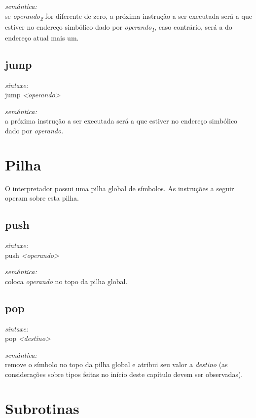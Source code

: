 \documentclass[12pt,a4paper,extrafontsizes,article]{memoir}
\newcommand*{\srcfont}{\fontfamily{pcr}\selectfont}
\begin{document}
\noindent \textit{semântica:}\\se \textit{operando\textsubscript{2}} for diferente de zero, a próxima instrução a ser executada será a que
estiver no endereço simbólico dado por \textit{operando\textsubscript{1}}, caso contrário, será a do endereço atual mais um.


\subsection{\textbf{jump}}

\textit{sintaxe:}\\{\srcfont jump \textit{<operando>}}

\noindent \textit{semântica:}\\a próxima instrução a ser executada será a que estiver no endereço simbólico dado por \textit{operando}.


\section{Pilha}
\label{sec:stack}

O interpretador possui uma pilha global de símbolos. As instruções a seguir operam sobre esta pilha.

\subsection{\textbf{push}}

\textit{sintaxe:}\\{\srcfont push \textit{<operando>}}

\noindent \textit{semântica:}\\coloca \textit{operando} no topo da pilha global.


\subsection{\textbf{pop}}

\textit{sintaxe:}\\{\srcfont pop \textit{<destino>}}

\noindent \textit{semântica:}\\remove o símbolo no topo da pilha global e atribui seu valor a \textit{destino} (as
considerações sobre tipos feitas no início deste capítulo devem ser observadas).


\section{Subrotinas}
\label{sec:subroutines}
\end{document}
